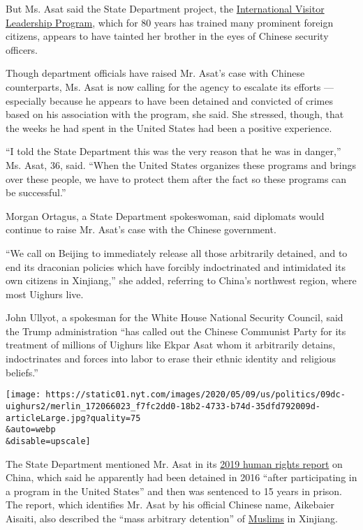 But Ms. Asat said the State Department project, the
\href{https://eca.state.gov/facesofexchange/}{International Visitor
Leadership Program}, which for 80 years has trained many prominent
foreign citizens, appears to have tainted her brother in the eyes of
Chinese security officers.

Though department officials have raised Mr. Asat's case with Chinese
counterparts, Ms. Asat is now calling for the agency to escalate its
efforts --- especially because he appears to have been detained and
convicted of crimes based on his association with the program, she said.
She stressed, though, that the weeks he had spent in the United States
had been a positive experience.

``I told the State Department this was the very reason that he was in
danger,'' Ms. Asat, 36, said. ``When the United States organizes these
programs and brings over these people, we have to protect them after the
fact so these programs can be successful.''

Morgan Ortagus, a State Department spokeswoman, said diplomats would
continue to raise Mr. Asat's case with the Chinese government.

``We call on Beijing to immediately release all those arbitrarily
detained, and to end its draconian policies which have forcibly
indoctrinated and intimidated its own citizens in Xinjiang,'' she added,
referring to China's northwest region, where most Uighurs live.

John Ullyot, a spokesman for the White House National Security Council,
said the Trump administration ``has called out the Chinese Communist
Party for its treatment of millions of Uighurs like Ekpar Asat whom it
arbitrarily detains, indoctrinates and forces into labor to erase their
ethnic identity and religious beliefs.''

\texttt{[image: https://static01.nyt.com/images/2020/05/09/us/politics/09dc-uighurs2/merlin\_172066023\_f7fc2dd0-18b2-4733-b74d-35dfd792009d-articleLarge.jpg?quality=75\\\&auto=webp\\\&disable=upscale]}

The State Department mentioned Mr. Asat in its
\href{https://www.state.gov/wp-content/uploads/2020/03/CHINA-INCLUSIVE-2019-HUMAN-RIGHTS-REPORT.pdf}{2019
human rights report} on China, which said he apparently had been
detained in 2016 ``after participating in a program in the United
States'' and then was sentenced to 15 years in prison. The report, which
identifies Mr. Asat by his official Chinese name, Aikebaier Aisaiti,
also described the ``mass arbitrary detention'' of
\href{https://www.nytimes.com/2019/02/21/business/china-xinjiang-uighur-dna-thermo-fisher.html}{Muslims}
in Xinjiang.


